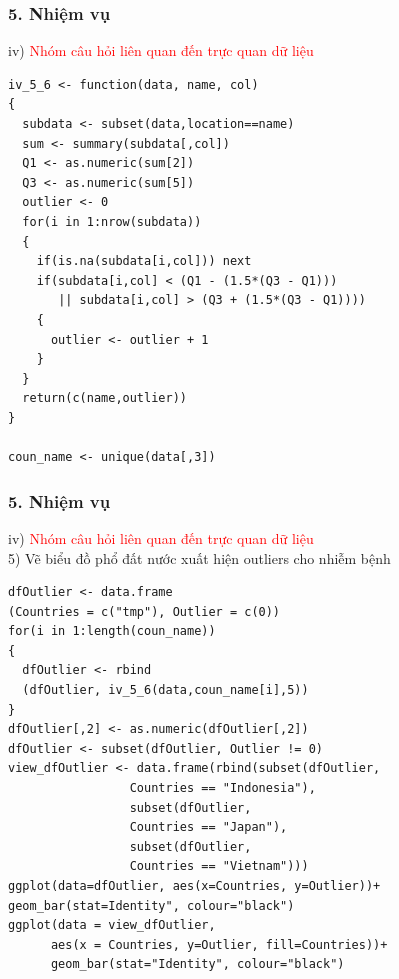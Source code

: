 \documentclass[english,10pt,table]{beamer}
\begin{document}
\begin{frame}[fragile]
\frametitle{5.  Nhiệm vụ}
iv) \textcolor{red}{Nhóm câu hỏi liên quan đến trực quan dữ liệu}\\
\lstset{
    title=Function and Prep for iv5-6}
\begin{lstlisting}[frame=single]  
iv_5_6 <- function(data, name, col)
{
  subdata <- subset(data,location==name)
  sum <- summary(subdata[,col])
  Q1 <- as.numeric(sum[2])
  Q3 <- as.numeric(sum[5])
  outlier <- 0
  for(i in 1:nrow(subdata))
  {
    if(is.na(subdata[i,col])) next
    if(subdata[i,col] < (Q1 - (1.5*(Q3 - Q1))) 
       || subdata[i,col] > (Q3 + (1.5*(Q3 - Q1))))
    {
      outlier <- outlier + 1
    }
  }
  return(c(name,outlier))
}

coun_name <- unique(data[,3])
\end{lstlisting}
\end{frame}

\begin{frame}[fragile]
\frametitle{5.  Nhiệm vụ}
iv) \textcolor{red}{Nhóm câu hỏi liên quan đến trực quan dữ liệu}\\
    5) Vẽ biểu đồ phổ đất nước xuất hiện outliers cho nhiễm bệnh
\begin{lstlisting}[frame=single]  
dfOutlier <- data.frame
(Countries = c("tmp"), Outlier = c(0))
for(i in 1:length(coun_name))
{
  dfOutlier <- rbind
  (dfOutlier, iv_5_6(data,coun_name[i],5))
}
dfOutlier[,2] <- as.numeric(dfOutlier[,2])
dfOutlier <- subset(dfOutlier, Outlier != 0)
view_dfOutlier <- data.frame(rbind(subset(dfOutlier, 
                 Countries == "Indonesia"),
                 subset(dfOutlier, 
                 Countries == "Japan"),
                 subset(dfOutlier, 
                 Countries == "Vietnam")))
ggplot(data=dfOutlier, aes(x=Countries, y=Outlier))+
geom_bar(stat=Identity", colour="black")
ggplot(data = view_dfOutlier, 
      aes(x = Countries, y=Outlier, fill=Countries))+
      geom_bar(stat="Identity", colour="black")
\end{lstlisting}
\end{frame}
\end{document}
